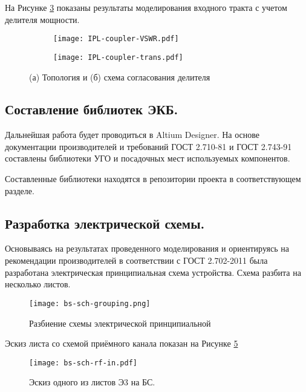 На Рисунке \ref{fig:IPL-coupler-results} показаны результаты моделирования входного тракта с учетом делителя мощности.

\begin{figure}[H]
	\centering
	\begin{subfigure}[c]{0.49\textwidth}
		\centering
		\texttt{[image: IPL-coupler-VSWR.pdf]}
		\caption{}%
		\label{fig:IPL-coupler-VSWR}
	\end{subfigure}
	\hfill
	\begin{subfigure}[c]{0.49\textwidth}
		\centering
		\texttt{[image: IPL-coupler-trans.pdf]}
		\caption{}%
		\label{fig:IPL-coupler-trans}
	\end{subfigure}
	\caption{%
		(а) Топология и 
		(б) схема согласования делителя
	}%
	\label{fig:IPL-coupler-results}
\end{figure}

\subsection{Составление библиотек ЭКБ.}

Дальнейшая работа будет проводиться в Altium Designer. На основе документации производителей и требований ГОСТ 2.710-81 и ГОСТ 2.743-91 составлены библиотеки УГО и посадочных мест используемых компонентов.

Составленные библиотеки находятся в репозитории проекта в соответствующем разделе.

\subsection{Разработка электрической схемы.}

Основываясь на результатах проведенного моделирования и ориентируясь на рекомендации производителей в соответствии с ГОСТ 2.702-2011 была разработана электрическая принципиальная схема устройства. Схема разбита на несколько листов.

\begin{figure}[H]
	\centering
	\texttt{[image: bs-sch-grouping.png]}
	\caption{Разбиение схемы электрической принципиальной}%
	\label{fig:bs-sch-grouping}
\end{figure}

Эскиз листа со схемой приёмного канала показан на Рисунке \ref{fig:bs-sch-rf-in}

\begin{figure}[H]
	\centering
	\texttt{[image: bs-sch-rf-in.pdf]}
	\caption{Эскиз одного из листов Э3 на БС.}%
	\label{fig:bs-sch-rf-in}
\end{figure}

